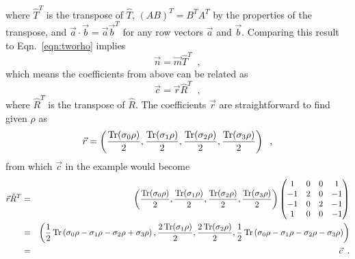 where $\hat{T}^T$ is the transpose of $\hat{T}$, $(AB)^T = B^TA^T$ by the properties of the transpose, and $\vec{a}\cdot\vec{b}=\vec{a}\vec{b}^T$ for any row vectors $\vec{a}$ and $\vec{b}$.  Comparing this result to Eqn.\ \ref{eqn:tworho} implies
$$
\vec{n} = \vec{m}\hat{T}^T\;\;,
$$
which means the coefficients from above can be related as
$$
\vec{c} = \vec{r}\hat{R}^T\;\;,
$$
where $\hat{R}^T$ is the transpose of $\hat{R}$.  The coefficients $\vec{r}$ are straightforward to find given $\rho$
as
$$
\vec{r} = \left(\frac{\operatorname{Tr}(\sigma_0 \rho)}{2},\frac{\operatorname{Tr}(\sigma_1 \rho)}{2},\frac{\operatorname{Tr}(\sigma_2 \rho)}{2},\frac{\operatorname{Tr}(\sigma_3 \rho)}{2}\right)\;\;,
$$
from which $\vec{c}$ in the example would become
\begin{eqnarray*}
\vec{r}\hat{R}^T &=& \left(\frac{\operatorname{Tr}(\sigma_0 \rho)}{2},\frac{\operatorname{Tr}(\sigma_1 \rho)}{2},\frac{\operatorname{Tr}(\sigma_2 \rho)}{2},\frac{\operatorname{Tr}(\sigma_3 \rho)}{2}\right)\begin{pmatrix}
1 & 0 & 0 & 1\\
-1 & 2 & 0 & -1\\
-1 & 0 & 2 & -1\\
1 & 0 & 0 & -1
\end{pmatrix}\\
&=& \left(\frac{1}{2}\operatorname{Tr}\left(\sigma_0 \rho-\sigma_1 \rho-\sigma_2 \rho+\sigma_3 \rho\right),\frac{2\operatorname{Tr}(\sigma_1 \rho)}{2},\frac{2\operatorname{Tr}(\sigma_2 \rho)}{2},\frac{1}{2}\operatorname{Tr}\left(\sigma_0 \rho-\sigma_1 \rho-\sigma_2 \rho-\sigma_3 \rho\right)\right)\\
&=&\vec{c}\;\;.
\end{eqnarray*}

